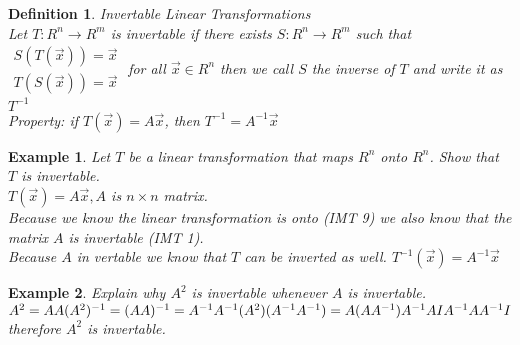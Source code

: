 \documentclass[a4paper,12pt,openany]{book}
\theoremstyle{defn}
\newtheorem{defn}{Definition}[section]
\theoremstyle{expl}
\newtheorem{expl}{Example}[section]
\begin{document}
\begin{defn}\textup{Invertable Linear Transformations\\
Let $T:R^n\rightarrow R^m$ is invertable if there exists $S:R^n\rightarrow R^m$ such that $\begin{array}{c}S(T(\vec{x}))=\vec{x}\\T(S(\vec{x}))=\vec{x}\end{array}$ for all $\vec{x}\in R^n$ then we call $S$ the inverse of $T$ and write it as $T^{-1}$\\
Property: if $T(\vec{x})=A\vec{x}$, then $T^{-1}=A^{-1}\vec{x}$  
}\end{defn}
\begin{expl}\textup{Let $T$ be a linear transformation that maps $R^n$ onto $R^n$. Show that $T$ is invertable.\\
$T(\vec{x})=A\vec{x}, A$ is $n\times n$ matrix.\\
Because we know the linear transformation is onto (IMT 9) we also know that the matrix $A$ is invertable (IMT 1).\\Because $A$ in vertable we know that $T$ can be inverted as well. $T^{-1}(\vec{x})=A^{-1}\vec{x}$}
\end{expl}
\begin{expl}\textup{Explain why $A^2$ is invertable whenever $A$ is invertable.}\\
$A^2=AA\\
(A^2)^{-1}=(AA)^{-1}=A^{-1}A^{-1}\\
(A^2)(A^{-1}A^{-1})=A(AA^{-1})A^{-1}\\
AIA^{-1}\\
AA^{-1}\\
I$ 
\textup{therefore $A^2$ is invertable.}
\end{expl}
\end{document}
